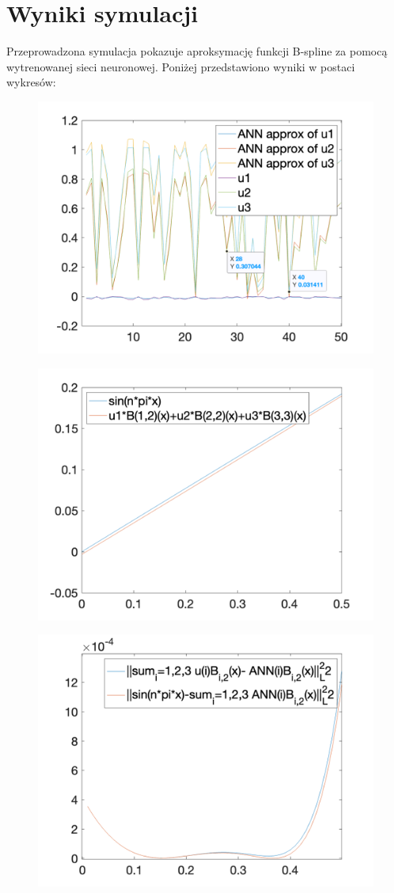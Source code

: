 \documentclass{article}
\begin{document}
\newpage
\section{Wyniki symulacji}
Przeprowadzona symulacja pokazuje aproksymację funkcji B-spline za pomocą wytrenowanej sieci neuronowej. Poniżej przedstawiono wyniki w postaci wykresów:

\begin{figure}[H]
    \centering
    \includegraphics[width=0.8\linewidth]{params_plot.png}
    \label{fig:params-plot}
\end{figure}

\begin{figure}[H]
    \centering
    \includegraphics[width=0.8\linewidth]{approx_plot.png}
    \label{fig:approx-plot}
\end{figure}

\begin{figure}[H]
    \centering
    \includegraphics[width=0.8\linewidth]{approx_plot_2.png}
    \label{fig:approx-plot}
\end{figure}
\end{document}

